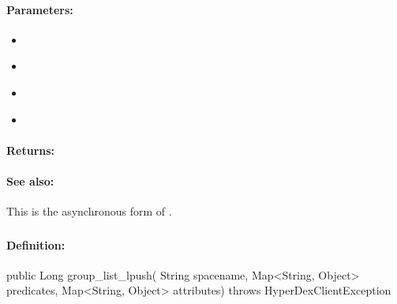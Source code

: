 \paragraph{Parameters:}
\begin{itemize}[noitemsep]
\item {}\\

\item {}\\

\item {}\\

\item {}\\

\end{itemize}

\paragraph{Returns:}


\paragraph{See also:}  This is the asynchronous form of .

\pagebreak
\subsubsection{}
\label{api:java:group_list_lpush}


\paragraph{Definition:}
\begin{javacode}
public Long group_list_lpush(
        String spacename,
        Map<String, Object> predicates,
        Map<String, Object> attributes) throws HyperDexClientException
\end{javacode}

